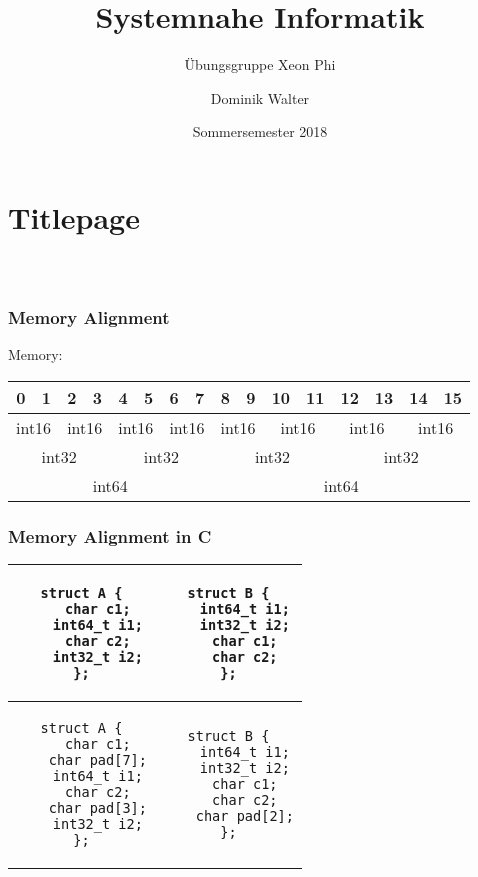 \documentclass[xcolor=pdftex,dvipsnames,table]{beamer}
\title{Systemnahe Informatik}
\subtitle{Übungsgruppe Xeon Phi}
\author{Dominik Walter}
\date{Sommersemester 2018}
\begin{document}
\section*{Titlepage}
\begin{frame}
  \frametitle{\ }
  \titlepage
\end{frame}


\begin{frame}
	\frametitle{Memory Alignment}
	Memory:
	\begin{tabular}{|c|c|c|c|c|c|c|c|c|c|c|c|c|c|c|c|}
		\hline
		0 & 1 & 2 & 3 & 4 & 5 & 6 & 7 & 8 & 9 & 10 & 11 & 12 & 13 & 14 & 15 \\
		\hline
		\hline
		\multicolumn{2}{|c|}{int16} &
		\multicolumn{2}{c|}{int16} &
		\multicolumn{2}{c|}{int16} &
		\multicolumn{2}{c|}{int16} &
		\multicolumn{2}{c|}{int16} &
		\multicolumn{2}{c|}{int16} &
		\multicolumn{2}{c|}{int16} &
		\multicolumn{2}{c|}{int16}\\
		\hline
		\multicolumn{4}{|c|}{int32} &
		\multicolumn{4}{c|}{int32} &
		\multicolumn{4}{c|}{int32} &
		\multicolumn{4}{c|}{int32}\\
		\hline
		\multicolumn{8}{|c|}{int64} &
		\multicolumn{8}{c|}{int64}\\
		\hline
	\end{tabular}
\end{frame}


\begin{frame}[fragile]
	\frametitle{Memory Alignment in C}
	\begin{tabular}{|c|c|}
		\hline
	\begin{lstlisting}	
struct A {
	char c1;
	int64_t i1;
	char c2;
	int32_t i2;
};
	\end{lstlisting} &
	\begin{lstlisting}	
struct B {
	int64_t i1;
	int32_t i2;
	char c1;
	char c2;
};
	\end{lstlisting}
	
	\\
	
	\hline
	\begin{lstlisting}	
struct A {
	char c1;
	char pad[7];
	int64_t i1;
	char c2;
	char pad[3];
	int32_t i2;
};
	\end{lstlisting} &
	\begin{lstlisting}	
struct B {
	int64_t i1;
	int32_t i2;
	char c1;
	char c2;
	char pad[2];
};
	\end{lstlisting} \\
	\hline
	
	\end{tabular}
	\end{frame}
\end{document}
